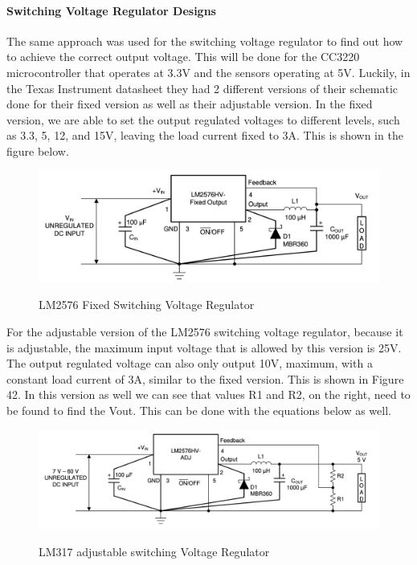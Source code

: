 \paragraph{Switching Voltage Regulator Designs}
The same approach was used for the switching voltage regulator to find out how to achieve the correct output voltage. This will be done for the CC3220 microcontroller that operates at 3.3V and the sensors operating at 5V. Luckily, in the Texas Instrument datasheet they had 2 different versions of their schematic done for their fixed version as well as their adjustable version. In the fixed version, we are able to set the output regulated voltages to different levels, such as 3.3, 5, 12, and 15V, leaving the load current fixed to 3A. This is shown in the figure below.\par
\begin{figure}[H]
    \centering
    \caption{LM2576 Fixed Switching Voltage Regulator}
    \includegraphics[width=\textwidth]{images/LM2576_Fixed.png}
    \label{fig:fixed-switching-voltage-regulator}
\end{figure}
For the adjustable version of the LM2576 switching voltage regulator, because it is adjustable, the maximum input voltage that is allowed by this version is 25V. The output regulated voltage can also only output 10V, maximum, with a constant load current of 3A, similar to the fixed version. This is shown in Figure 42. In this version as well we can see that values R1 and R2, on the right, need to be found to find the Vout. This can be done with the equations below as well.\par
\begin{figure}[H]
    \centering
    \caption{LM317 adjustable switching Voltage Regulator}
    \includegraphics[width=\textwidth]{images/LM2576_Adjustable.png}
    \label{fig:5V-linear-voltage-regulator}
\end{figure}

